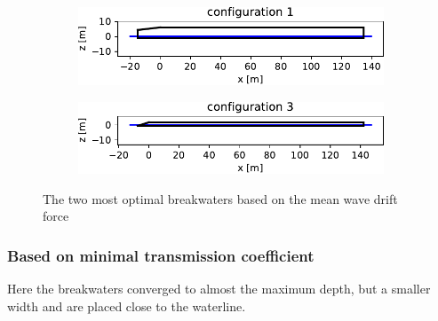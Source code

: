 \begin{figure}[h]
    \centering
    \begin{subfigure}[b]{0.49\textwidth}
        \centering
        \includegraphics[width=\textwidth]{figures/ComFLOW/Breakwater Geometries/DI1 moving/WC2/optima_Fd/breakwater_geometry1.pdf}
        \caption[]%
        {{\small}}    
        \label{fig: opt breakwater 1 moving fd WC2}
    \end{subfigure}
    \hfill
    \begin{subfigure}[b]{0.49\textwidth}  
        \centering 
        \includegraphics[width=\textwidth]{figures/ComFLOW/Breakwater Geometries/DI1 moving/WC2/optima_Fd/breakwater_geometry3.pdf}
        \caption[]%
        {{\small}}    
        \label{fig: opt breakwater 3 moving fd WC2}
    \end{subfigure}
    
    \caption{The two most optimal breakwaters based on the mean wave drift force}
    \label{fig: two most optimal breakwaters moving fd WC2}
\end{figure}




\subsubsection{Based on minimal transmission coefficient}

Here the breakwaters converged to almost the maximum depth, but a smaller width and are placed close to the waterline. 

